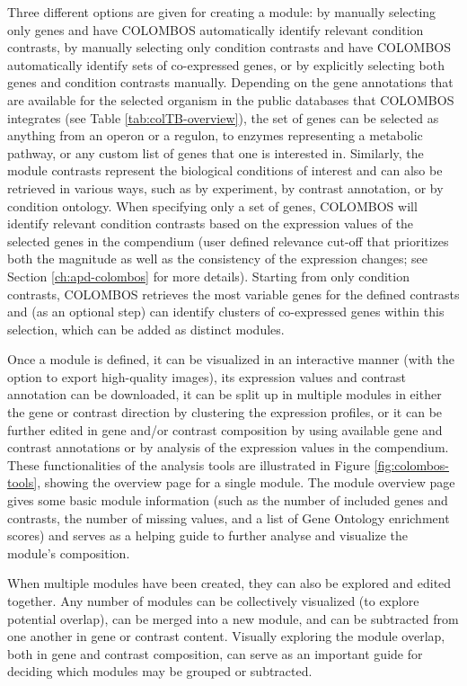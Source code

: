 Three different options are given for creating a module: by manually selecting 
only genes and have COLOMBOS automatically identify relevant condition 
contrasts, by manually selecting only condition contrasts and have COLOMBOS 
automatically identify sets of co-expressed genes, or by explicitly selecting 
both genes and condition contrasts manually. Depending on the gene annotations 
that are available for the selected organism in the public databases that 
COLOMBOS integrates (see Table \ref{tab:colTB-overview}), the set of genes can 
be selected as anything from an operon or a regulon, to enzymes representing a 
metabolic pathway, or any custom list of genes that one is interested in. 
Similarly, the module contrasts represent the biological conditions of interest 
and can also be retrieved in various ways, such as by experiment, by contrast 
annotation, or by condition ontology. When specifying only a set of genes, 
COLOMBOS will identify relevant condition contrasts based on the expression 
values of the selected genes in the compendium (user defined relevance cut-off 
that prioritizes both the magnitude as well as the consistency of the 
expression changes; see Section \ref{ch:apd-colombos} for more details). 
Starting from only condition contrasts, COLOMBOS retrieves the most variable 
genes for the defined contrasts and (as an optional step) can identify clusters 
of co-expressed genes within this selection, which can be added as distinct 
modules.

Once a module is defined, it can be visualized in an interactive manner (with 
the option to export high-quality images), its expression values and contrast 
annotation can be downloaded, it can be split up in multiple modules in either 
the gene or contrast direction by clustering the expression profiles, or it can 
be further edited in gene and/or contrast composition by using available gene 
and contrast annotations or by analysis of the expression values in the 
compendium. These functionalities of the analysis tools are illustrated in 
Figure \ref{fig:colombos-tools}, showing the overview page for a single module. 
The module overview page gives some basic module information (such as the 
number of included genes and contrasts, the number of missing values, and a 
list of Gene Ontology enrichment scores) and serves as a helping guide to 
further analyse and visualize the module's composition.

When multiple modules have been created, they can also be explored and edited 
together. Any number of modules can be collectively visualized (to explore 
potential overlap), can be merged into a new module, and can be subtracted from 
one another in gene or contrast content. Visually exploring the module overlap, 
both in gene and contrast composition, can serve as an important guide for 
deciding which modules may be grouped or subtracted.

